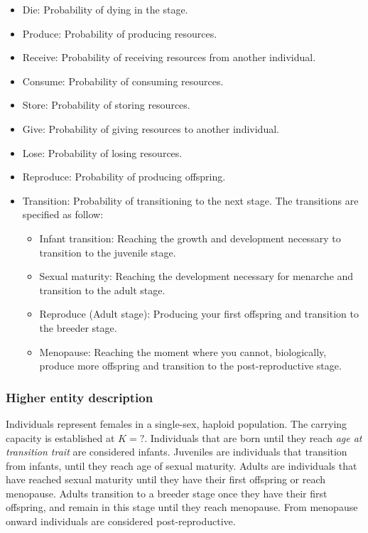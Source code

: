 \documentclass{article}
\begin{document}
\begin{itemize}
    \item Die: Probability of dying in the stage.
    \item Produce: Probability of producing resources.
    \item Receive: Probability of receiving resources from another individual.
    \item Consume: Probability of consuming resources.
    \item Store: Probability of storing resources.
    \item Give: Probability of giving resources to another individual.
    \item Lose: Probability of losing resources.
    \item Reproduce: Probability of producing offspring.
    \item Transition: Probability of transitioning to the next stage. The transitions are specified as follow:
    \begin{itemize}
        \item Infant transition: Reaching the growth and development necessary to transition to the juvenile stage.
        \item Sexual maturity: Reaching the development necessary for menarche and transition to the adult stage.
        \item Reproduce (Adult stage): Producing your first offspring and transition to the breeder stage.
        \item Menopause: Reaching the moment where you cannot, biologically, produce more offspring and transition to the post-reproductive stage.
    \end{itemize}
\end{itemize}

\subsubsection{Higher entity description}

Individuals represent females in a single-sex, haploid population. The carrying capacity is established at $K=?$. Individuals that are born until they reach \emph{age at transition trait} are considered infants. Juveniles are individuals that transition from infants, until they reach age of sexual maturity. Adults are individuals that have reached sexual maturity until they have their first offspring or reach menopause. Adults transition to a breeder stage once they have their first offspring, and remain in this stage until they reach menopause. From menopause onward individuals are considered post-reproductive.
\end{document}
